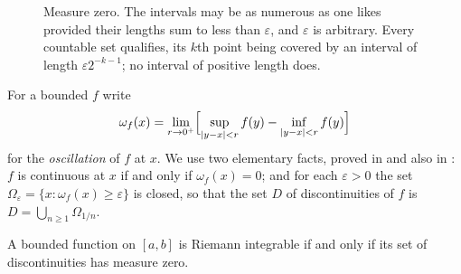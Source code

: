 \begin{figure}[htbp]
\centering
{}
\caption{Measure zero. The intervals may be as numerous as one likes provided
their lengths sum to less than $\varepsilon$, and $\varepsilon$ is arbitrary.
Every countable set qualifies, its $k$th point being covered by an interval
of length $\varepsilon 2^{-k-1}$; no interval of positive length does.}
\label{fig:measurezero}
\end{figure}

For a bounded $f$ write
\[ \omega_f(x) = \lim_{r\to 0^+}\Bigl[\sup_{|y-x|<r} f(y)
   - \inf_{|y-x|<r} f(y)\Bigr] \]
for the \emph{oscillation} of $f$ at $x$. We use two elementary facts, proved
in \cite[appendices to Chapters 2 and 4]{annotated} and also in
\cite[Lect.~21]{yupin}: $f$ is continuous at $x$ if and only if
$\omega_f(x)=0$; and for each $\varepsilon>0$ the set
$\Omega_\varepsilon = \{x : \omega_f(x)\ge\varepsilon\}$ is closed, so that
the set $D$ of discontinuities of $f$ is
$D = \bigcup_{n\ge1}\Omega_{1/n}$.

\begin{theorem}\label{thm:lebesgue}
A bounded function on $[a,b]$ is Riemann integrable if and only if its set of
discontinuities has measure zero.
\end{theorem}

